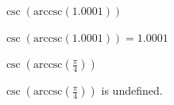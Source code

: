 \documentclass{ximera}
\begin{document}
\begin{question}
\begin{problem}
$\csc\left(\text{arccsc}\left(1.0001\right)\right)$

\begin{solution}
$\csc\left(\text{arccsc}\left(1.0001\right)\right) = 1.0001$
\end{solution}
\end{problem}

\begin{problem} \label{comboexactlast}
$\csc\left(\text{arccsc}\left( \frac{\pi}{4} \right)\right)$

\begin{solution}
$\csc\left(\text{arccsc}\left( \frac{\pi}{4} \right)\right)$ is undefined.
\end{solution}
\end{problem}

\end{question}
\end{document}
